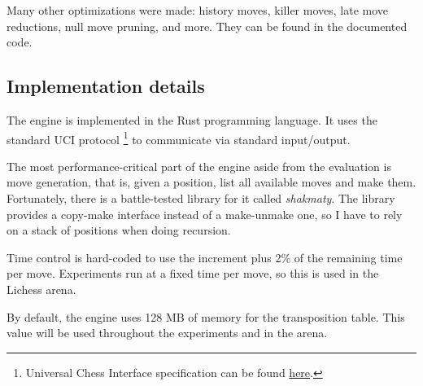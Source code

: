 Many other optimizations were made: history moves, killer moves, late move reductions, null move pruning, and more. They can be found in the documented code.


\subsection{Implementation details}


The engine is implemented in the Rust programming language. It uses the standard UCI protocol \footnote{Universal Chess Interface specification can be found \href{https://www.shredderchess.com/chess-features/uci-universal-chess-interface.html}{here}.} to communicate via standard input/output.

The most performance-critical part of the engine aside from the evaluation is move generation, that is, given a position, list all available moves and make them.
Fortunately, there is a battle-tested library for it called \textit{shakmaty}. The library provides a copy-make interface instead of a make-unmake one, so I have to rely on a stack of positions when doing recursion.

Time control is hard-coded to use the increment plus 2\% of the remaining time per move. Experiments run at a fixed time per move, so this is used in the Lichess arena.

By default, the engine uses 128 MB of memory for the transposition table. This value will be used throughout the experiments and in the arena.

